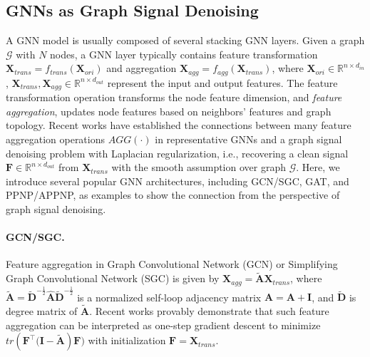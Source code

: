 \documentclass[letterpaper]{article} %
\theoremstyle{plain}
\theoremstyle{definition}
\theoremstyle{remark}
\begin{document}
\subsection{GNNs as Graph Signal Denoising}
A GNN model is usually composed of several stacking GNN layers. Given a graph $\mathcal{G}$ with $N$ nodes, a GNN layer typically contains feature transformation $\mathbf{X}_{trans}=f_{trans}(\mathbf{X}_{ori})$ and aggregation $\mathbf{X}_{agg}=f_{agg}(\mathbf{X}_{trans})$, where $\mathbf{X}_{ori}\in\mathbb{R}^{n\times d_{in}}$, $\mathbf{X}_{trans}, \mathbf{X}_{agg}\in\mathbb{R}^{n\times d_{out}}$ represent the input and output features. The feature transformation operation transforms the node feature dimension, and \emph{feature aggregation}, updates node features based on neighbors' features and graph topology. Recent works \citep{ma2021unified, zhu2021interpreting} have established the connections between many feature aggregation operations $AGG(\cdot)$  in representative GNNs and a graph signal denoising problem with Laplacian regularization, i.e., recovering a clean signal $\mathbf{F}\in\mathbb{R}^{n\times d_{out}}$ from $\mathbf{X}_{trans}$ with the smooth
assumption over graph $\mathcal{G}$. Here, we introduce several popular GNN architectures, including GCN/SGC, GAT, and PPNP/APPNP, as examples to show the connection from the perspective of graph signal denoising.

\paragraph{GCN/SGC.} Feature aggregation in Graph Convolutional Network (GCN) or Simplifying Graph Convolutional Network (SGC) is given by $\mathbf{X}_{agg}=\tilde{\mathbf{A}}\mathbf{X}_{trans}$, where $\tilde{\mathbf{A}}=\tilde{\mathbf{D}}^{-\frac{1}{2}}\hat{\mathbf{A}}\tilde{\mathbf{D}}^{-\frac{1}{2}}$ is a normalized self-loop adjacency matrix $\hat{\mathbf{A}}=\mathbf{A}+\mathbf{I}$, and $\tilde{\mathbf{D}}$ is degree matrix of $\tilde{\mathbf{A}}$. Recent works \citep{ma2021unified, zhu2021interpreting} provably demonstrate that such feature aggregation can be interpreted as one-step gradient descent to minimize $tr(\mathbf{F}^{\top}\big(\mathbf{I}-\tilde{\mathbf{A}})\mathbf{F}\big)$ with initialization $\mathbf{F}=\mathbf{X}_{trans}$.
\end{document}

